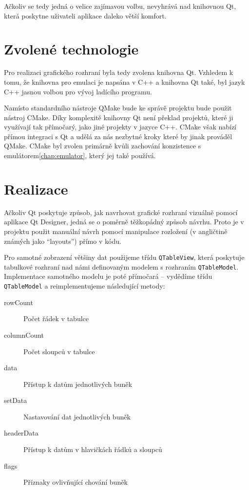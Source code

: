 Ačkoliv se tedy jedná o velice zajímavou volbu, nevyhrává nad knihovnou Qt, která poskytne uživateli aplikace daleko větší komfort.

\section{Zvolené technologie}

Pro realizaci grafického rozhraní byla tedy zvolena knihovna Qt. Vzhledem k tomu, že knihovna pro emulaci je napsána v C++ a knihovna Qt také, byl jazyk C++ jasnou volbou pro vývoj ladícího programu.

Namísto standardního nástroje QMake bude ke správě projektu bude použit nástroj CMake. Díky komplexitě knihovny Qt není překlad projektů, které ji využívají tak přímočarý, jako jiné projekty v jazyce C++. CMake však nabízí přímou integraci s Qt a udělá za nás nezbytné kroky které by jinak prováděl QMake. CMake byl zvolen primárně kvůli zachování konzistence s emulátorem\ref{chap:emulator}, který jej také používá.

\section{Realizace}

Ačkoliv Qt poskytuje způsob, jak navrhovat grafické rozhraní vizuálně pomocí aplikace Qt Designer\cite{qt-designer}, jedná se o poměrně těžkopádný způsob návrhu. Proto je v projektu použit manuální návrh pomocí manipulace rozložení (v angličtině známých jako ``layouts'') přímo v kódu.

Pro samotné zobrazení většiny dat použijeme třídu \texttt{QTableView}, která poskytuje tabulkové rozhraní nad námi definovaným modelem s rozhraním \texttt{QTableModel}. Implementace samotného modelu je poté přímočará -- vydědíme třídu \texttt{QTableModel} a reimplementujeme následující metody:

\begin{description}
	\item[rowCount] Počet řádek v tabulce
	\item[columnCount] Počet sloupců v tabulce
	\item[data] Přístup k datům jednotlivých buněk
	\item[setData] Nastavování dat jednotlivých buněk
	\item[headerData] Přístup k datům v hlavičkách řádků a sloupců
	\item[flags] Příznaky ovlivňující chování buněk
\end{description}

